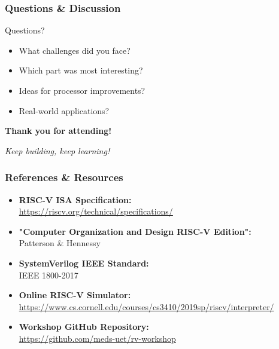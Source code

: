 \documentclass[aspectratio=169,xcolor=dvipsnames]{beamer}
\begin{document}
\begin{frame}
\frametitle{Questions \& Discussion}
\begin{center}
\huge{Questions?}
\end{center}

\vspace{2em}
\begin{itemize}
    \item What challenges did you face?
    \item Which part was most interesting?
    \item Ideas for processor improvements?
    \item Real-world applications?
\end{itemize}

\vspace{2em}
\begin{center}
\textbf{Thank you for attending!}

\vspace{1em}
\textit{Keep building, keep learning!}
\end{center}
\end{frame}

\begin{frame}
\frametitle{References \& Resources}
\begin{itemize}
    \item \textbf{RISC-V ISA Specification:} \\
    \url{https://riscv.org/technical/specifications/}
    
    \item \textbf{"Computer Organization and Design RISC-V Edition":} \\
    Patterson \& Hennessy
    
    \item \textbf{SystemVerilog IEEE Standard:} \\
    IEEE 1800-2017
    
    \item \textbf{Online RISC-V Simulator:} \\
    \url{https://www.cs.cornell.edu/courses/cs3410/2019sp/riscv/interpreter/}
       
    \item \textbf{Workshop GitHub Repository:} \\
    \url{https://github.com/meds-uet/rv-workshop}
\end{itemize}
\end{frame}
\end{document}
